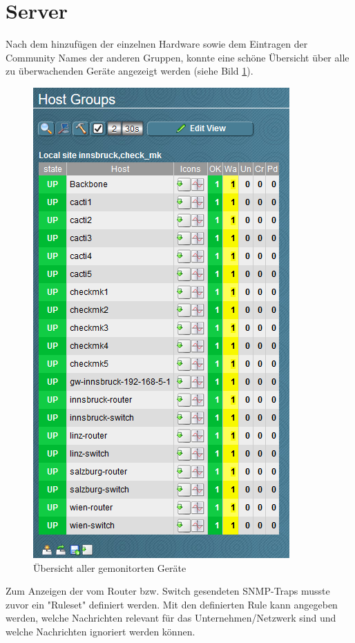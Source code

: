 \section{Server}

Nach dem hinzufügen der einzelnen Hardware sowie dem Eintragen der Community Names der anderen Gruppen, konnte eine schöne Übersicht über alle zu überwachenden Geräte angezeigt werden (siehe Bild \ref{img:uebersicht}).

\begin{figure}[H]
	\centering
	\includegraphics[scale=1]{img/hostgroups.PNG}
	\caption{Übersicht aller gemonitorten Geräte}
	\label{img:uebersicht}
\end{figure}

Zum Anzeigen der vom Router bzw. Switch gesendeten \ac{SNMP}-Traps musste zuvor ein "Ruleset" definiert werden. 
Mit den definierten Rule kann angegeben werden, welche Nachrichten relevant für das Unternehmen/Netzwerk sind und welche Nachrichten ignoriert werden können.



